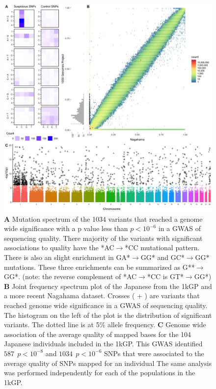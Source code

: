 \documentclass[9pt,lineno]{elife}
\begin{document}
\begin{figure}
\includegraphics[width=\hsize,keepaspectratio]{Figure1.jpg}
\caption{
\textbf{A} 
Mutation spectrum of the 1034 variants that reached a genome wide significance with a p value less than $p < 10^{-6}$  in a GWAS of sequencing quality. 
There majority of the variants with significant associations to quality have the *AC${\rightarrow}$*CC mutational pattern. There is also an slight enrichment in GA*${\rightarrow}$GG* and GC*${\rightarrow}$GG* mutations. These three enrichments can be summarized as G**${\rightarrow}$GG*. (note: the reverse complement of *AC${\rightarrow}$*CC is GT*${\rightarrow}$GG*)
\textbf{B} 
Joint frequency spectrum plot of the Japanese from the 1kGP and a more recent Nagahama dataset.
Crosses ( + ) are variants that reached genome wide significance in a GWAS of sequencing quality. 
The histogram on the left of the plot is the distribution of significant variants. 
The dotted line is at 5\% allele frequency. 
\textbf{C} 
Genome wide association of the average quality of mapped bases for the 104 Japanese individuals included in the 1kGP. This GWAS identified $587\ \  p < 10^{-8}$ and $1034\ \ p < 10^{-6}$ SNPs that were associated to the average quality of SNPs mapped for an individual
The same analysis was performed independently for each of the populations in the 1kGP. }
 \label{SFS}
\end{figure}
\end{document}

